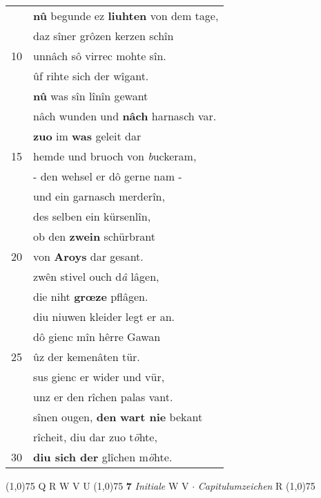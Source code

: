 \documentclass[8pt,a4paper,notitlepage]{article}
\begin{document}
\begin{table}[ht]
\begin{minipage}[t]{0.5\linewidth}
\begin{tabular}{rl}
 & \textbf{nû} begunde ez \textbf{liuhten} von dem tage,\\ 
 & daz sîner grôzen kerzen schîn\\ 
10 & unnâch sô virrec mohte sîn.\\ 
 & ûf rihte sich der wîgant.\\ 
 & \textbf{nû} was sîn lînîn gewant\\ 
 & nâch wunden und \textbf{nâch} harnasch var.\\ 
 & \textbf{zuo} im \textbf{was} geleit dar\\ 
15 & hemde und bruoch von \textit{b}uckeram,\\ 
 & - den wehsel er dô gerne nam -\\ 
 & und ein garnasch merderîn,\\ 
 & des selben ein kürsenlîn,\\ 
 & ob den \textbf{zwein} schürbrant\\ 
20 & von \textbf{Aroys} dar gesant.\\ 
 & zwên stivel ouch d\textit{â} lâgen,\\ 
 & die niht \textbf{grœze} pflâgen.\\ 
 & diu niuwen kleider legt er an.\\ 
 & dô gienc mîn hêrre Gawan\\ 
25 & ûz der kemenâten tür.\\ 
 & sus gienc er wider und vür,\\ 
 & unz er den rîchen palas vant.\\ 
 & sînen ougen, \textbf{den} \textbf{wart nie} bekant\\ 
 & rîcheit, diu dar zuo t\textit{ö}hte,\\ 
30 & \textbf{diu sich der} glîchen m\textit{ö}hte.\\ 
\end{tabular}
\scriptsize
\line(1,0){75} \newline
Q R W V U \newline
\line(1,0){75} \newline
\textbf{7} \textit{Initiale} W V   $\cdot$ \textit{Capitulumzeichen} R  \newline
\line(1,0){75} \newline

\end{minipage}
\end{table}
\end{document}
